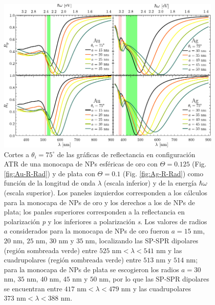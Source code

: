 	\begin{figure}[h!]\centering
	\includegraphics[scale=1]{2-Resultados/figs/8-AurVar/0-cut75_Au_Aug.pdf}\vspace*{-.5em}
	\caption{Cortes a $\theta_i = 75^\circ$ de las gráficas de reflectancia  en configuración ATR  de una monocapa de NPs esféricas de oro con $\Theta=0.125$ (Fig. \ref{fig:Au-R-Rad}) y de plata con $\Theta=0.1$ (Fig. \ref{fig:Ag-R-Rad}) como función de la longitud de onda $\lambda$ (escala inferior) y de la energía $\hbar\omega$ (escala superior). Los paneles izquierdos corresponden a los cálculos para la monocapa de NPs de oro y los derechos a los de NPs de plata; los panles superiores corresponden a la reflectancia en polarización \emph{p} y los inferiores a polarización \emph{s}. Los valores de radios $a$ considerados para la monocapa de NPs de oro fueron  $a=15$ nm, $20$ nm, $25$ nm, $30$ nm y $35$ nm, localizando las SP-SPR dipolares (región sombreada verde) entre $525\mbox{ nm}<\lambda<541\mbox{ nm}$ y las cuadrupolares  (región sombreada verde) entre $513$ nm y $514$ nm; para la monocapa de NPs de plata se escogieron los radios  $a=30$ nm, $35$ nm, $40$ nm, $45$ nm y $50$ nm, por lo que las SP-SPR dipolares se encuentran entre $417\mbox{ nm}<\lambda<479\mbox{ nm}$ y las cuadrupolares $373\mbox{ nm}<\lambda<388\mbox{ nm}$.}\label{fig:AuAg-Cuts-Rad-75}
	\end{figure}	

